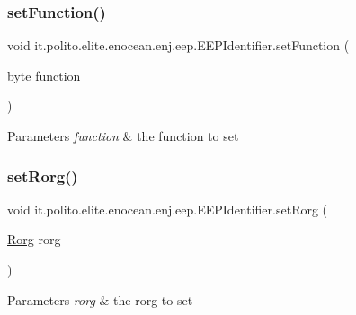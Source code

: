 \subsubsection{\texorpdfstring{set\+Function()}{setFunction()}}
{\footnotesize\ttfamily void it.\+polito.\+elite.\+enocean.\+enj.\+eep.\+E\+E\+P\+Identifier.\+set\+Function (\begin{DoxyParamCaption}\item[{byte}]{function }\end{DoxyParamCaption})}


\begin{DoxyParams}{Parameters}
{\em function} & the function to set \\
\hline
\end{DoxyParams}
\hypertarget{classit_1_1polito_1_1elite_1_1enocean_1_1enj_1_1eep_1_1_e_e_p_identifier_a473abce21a7d78057d09db8731a8e95e}{}\label{classit_1_1polito_1_1elite_1_1enocean_1_1enj_1_1eep_1_1_e_e_p_identifier_a473abce21a7d78057d09db8731a8e95e} 
\subsubsection{\texorpdfstring{set\+Rorg()}{setRorg()}}
{\footnotesize\ttfamily void it.\+polito.\+elite.\+enocean.\+enj.\+eep.\+E\+E\+P\+Identifier.\+set\+Rorg (\begin{DoxyParamCaption}\item[{\hyperlink{classit_1_1polito_1_1elite_1_1enocean_1_1enj_1_1eep_1_1_rorg}{Rorg}}]{rorg }\end{DoxyParamCaption})}


\begin{DoxyParams}{Parameters}
{\em rorg} & the rorg to set \\
\hline
\end{DoxyParams}
\hypertarget{classit_1_1polito_1_1elite_1_1enocean_1_1enj_1_1eep_1_1_e_e_p_identifier_ab2f8ea97578573c6a543dc9ab04c5f34}{}\label{classit_1_1polito_1_1elite_1_1enocean_1_1enj_1_1eep_1_1_e_e_p_identifier_ab2f8ea97578573c6a543dc9ab04c5f34} 
